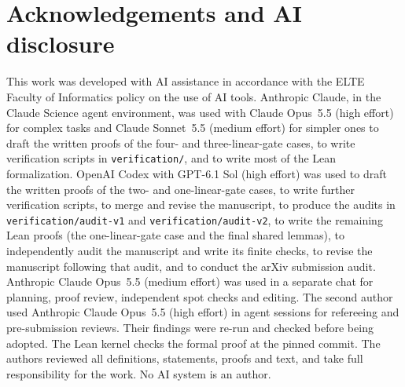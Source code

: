 \documentclass[11pt,a4paper]{article}
\theoremstyle{plain}
\theoremstyle{remark}
\theoremstyle{plain}
\begin{document}
\section*{Acknowledgements and AI disclosure}
This work was developed with AI assistance in accordance with the ELTE Faculty of
Informatics policy on the use of AI tools. Anthropic Claude, in the Claude Science
agent environment, was used with Claude Opus~5.5 (high effort) for complex tasks and
Claude Sonnet~5.5 (medium effort) for simpler ones to draft the written proofs of the
four- and three-linear-gate cases, to write verification scripts in
\texttt{verification/}, and to write most of the Lean formalization. OpenAI Codex with
GPT-6.1 Sol (high effort) was used to draft the written proofs of the two- and
one-linear-gate cases, to write further verification scripts, to merge and revise the
manuscript, to produce the audits in \texttt{verification/audit-v1} and
\texttt{verification/audit-v2}, to write the remaining Lean proofs (the
one-linear-gate case and the final shared lemmas), to independently audit the
manuscript and write its finite checks, to revise the manuscript following that audit,
and to conduct the arXiv submission audit. Anthropic Claude Opus~5.5 (medium effort)
was used in a separate chat for planning, proof review, independent spot checks and
editing. The second author used Anthropic Claude Opus~5.5 (high effort) in agent
sessions for refereeing and pre-submission reviews. Their findings were re-run and
checked before being adopted. The Lean kernel checks the formal proof at the pinned
commit. The authors reviewed all definitions, statements, proofs and text, and take
full responsibility for the work. No AI system is an author.

\begingroup\raggedright


\endgroup
\end{document}
